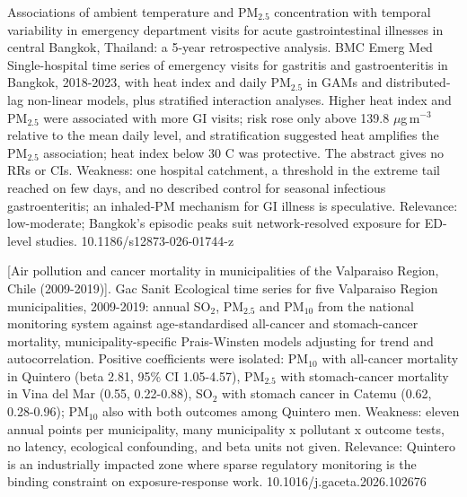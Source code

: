 \documentclass[10pt]{article}
\begin{document}
{Associations of ambient temperature and PM$_{2.5}$ concentration with temporal variability in emergency department visits for acute gastrointestinal illnesses in central Bangkok, Thailand: a 5-year retrospective analysis.}
{BMC Emerg Med}
{Single-hospital time series of emergency visits for gastritis and gastroenteritis in Bangkok, 2018-2023, with heat index and daily PM$_{2.5}$ in GAMs and distributed-lag non-linear models, plus stratified interaction analyses. Higher heat index and PM$_{2.5}$ were associated with more GI visits; risk rose only above 139.8 $\mu$g\,m$^{-3}$ relative to the mean daily level, and stratification suggested heat amplifies the PM$_{2.5}$ association; heat index below 30 C was protective. The abstract gives no RRs or CIs. Weakness: one hospital catchment, a threshold in the extreme tail reached on few days, and no described control for seasonal infectious gastroenteritis; an inhaled-PM mechanism for GI illness is speculative. Relevance: low-moderate; Bangkok's episodic peaks suit network-resolved exposure for ED-level studies.}
{10.1186/s12873-026-01744-z}

{[Air pollution and cancer mortality in municipalities of the Valparaiso Region, Chile (2009-2019)].}
{Gac Sanit}
{Ecological time series for five Valparaiso Region municipalities, 2009-2019: annual SO$_2$, PM$_{2.5}$ and PM$_{10}$ from the national monitoring system against age-standardised all-cancer and stomach-cancer mortality, municipality-specific Prais-Winsten models adjusting for trend and autocorrelation. Positive coefficients were isolated: PM$_{10}$ with all-cancer mortality in Quintero (beta 2.81, 95\% CI 1.05-4.57), PM$_{2.5}$ with stomach-cancer mortality in Vina del Mar (0.55, 0.22-0.88), SO$_2$ with stomach cancer in Catemu (0.62, 0.28-0.96); PM$_{10}$ also with both outcomes among Quintero men. Weakness: eleven annual points per municipality, many municipality x pollutant x outcome tests, no latency, ecological confounding, and beta units not given. Relevance: Quintero is an industrially impacted zone where sparse regulatory monitoring is the binding constraint on exposure-response work.}
{10.1016/j.gaceta.2026.102676}
\end{document}
